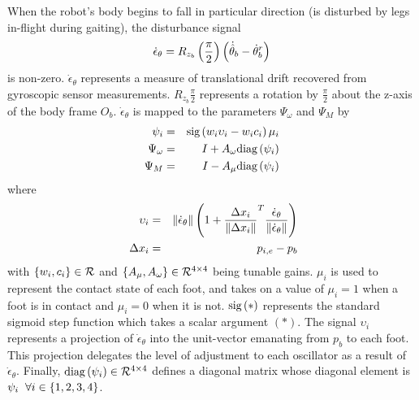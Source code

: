 			When the robot's body begins to fall in particular direction (\IE is disturbed by legs in-flight during gaiting), the disturbance signal 
				\begin{equation}
					\dot{\epsilon}_{\theta} = {R}_{z_{b}}\left(\frac{\pi}{2}\right)\left(\dot{\hat{\theta}}_{b} - \dot{\theta}_{b}^{r}\right)
				\end{equation}
			is non-zero. $\dot{\epsilon}_{\theta}$ represents a measure of translational drift recovered from gyroscopic sensor measurements. ${R}_{z_{b}}{\frac{\pi}{2}}$ represents a rotation by $\frac{\pi}{2}$ about the z-axis of the body frame $O_{b}$. $\dot{\epsilon}_{\theta}$ is mapped to the parameters $\Psi_{\omega}$ and $\Psi_{M}$ by
				\begin{eqnarray}
					\psi_{i} 			&=& \text{sig}\left(  w_{i} \upsilon_{i} - w_{i} c_{i} \right) {\mu}_{i} 	\nonumber\\
					\Psi_{\omega} 		&=& I + A_{\omega}\text{diag}\left( \psi_{i} \right) 						\nonumber\\
					\Psi_{M}			&=& I - A_{\mu} \text{diag}\left(  \psi_{i} \right) 
					\label{eq::cpg_modulations}
				\end{eqnarray}
			where
				\begin{eqnarray}
					\upsilon_{i} 		&=& \left\lVert \dot{\epsilon}_{\theta} \right\rVert \left(1 + \frac{\Delta x_{i}}{\left\lVert\Delta x_{i}\right\rVert}^T  \frac{ \dot{\epsilon}_{\theta}  }{\left\lVert \dot{\epsilon}_{\theta}  \right\rVert} \right)	\nonumber\\\
					\Delta x_{i}		&=& {p}_{i,e} - {p}_{b}
				\end{eqnarray}
			with $\{w_{i}, c_{i}\} \in{\cal R}^{}$ and $\{A_{\mu}, A_{\omega}\} \in{\cal R}^{4\times4}$ being tunable gains. ${\mu}_{i}$ is used to represent the contact state of each \Ith foot, and takes on a value of ${\mu}_{i}=1$ when a foot is in contact and ${\mu}_{i}=0$ when it is not. $\text{sig}\left(*\right)$ represents the standard sigmoid step function which takes a scalar argument $(*)$. The signal $\upsilon_{i}$ represents a projection of $\dot{\epsilon}_{\theta}$ into the unit-vector emanating from ${p}_{b}$ to each \Ith foot. This projection delegates the level of adjustment to each \Ith oscillator as a result of $\dot{\epsilon}_{\theta}$. Finally, $\text{diag}\left(  \psi_{i} \right) \in {\cal R}^{4\times4}$ defines a diagonal matrix whose \Ith diagonal element is $\psi_{i}\hspace{2mm}\forall i\in\{1,2,3,4\}$.	

